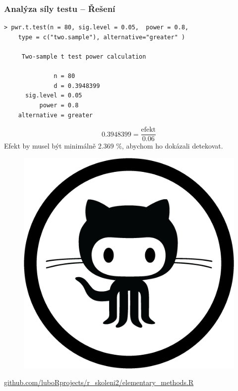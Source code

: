 \documentclass[10pt,xcolor={dvipsnames}]{beamer}
\begin{document}

\begin{frame}[fragile]
\frametitle{Analýza síly testu -- Řešení}
\begin{verbatim}
> pwr.t.test(n = 80, sig.level = 0.05,  power = 0.8, 
    type = c("two.sample"), alternative="greater" )

     Two-sample t test power calculation 

              n = 80
              d = 0.3948399
      sig.level = 0.05
          power = 0.8
    alternative = greater

\end{verbatim}
\[0.3948399 = \frac{\text{efekt}}{0.06} \]
\textcolor{NavyBlue}{Efekt by musel být minimálně 2.369 \%, abychom ho dokázali detekovat.}
\end{frame}


\begin{frame}
\begin{figure}
\includegraphics[scale=0.3]{github}
\end{figure}
\bigskip
\url{github.com/luboRprojects/r_skoleni2/elementary_methods.R}
\vspace{1cm}
\end{frame}

\end{document}
